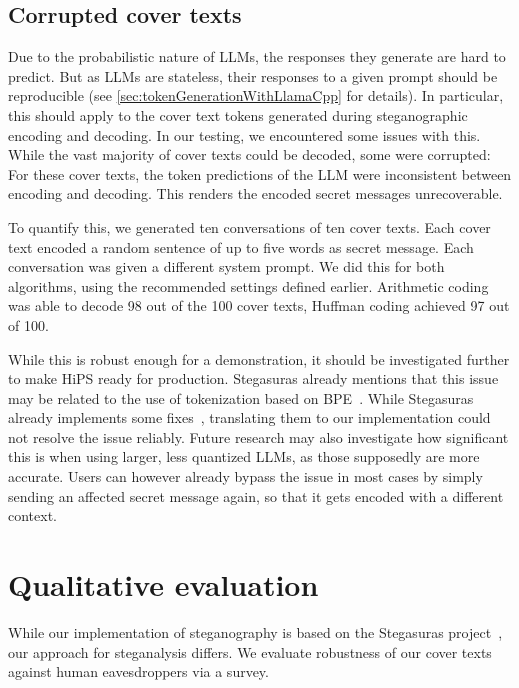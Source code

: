 \subsection{Corrupted cover texts}
\label{sec:corruptedCoverTexts}
Due to the probabilistic nature of \glspl{LLM}, the responses they generate are hard to predict. But as \glspl{LLM} are stateless, their responses to a given prompt should be reproducible (see \cref{sec:tokenGenerationWithLlamaCpp} for details). In particular, this should apply to the cover text tokens generated during steganographic encoding and decoding. In our testing, we encountered some issues with this. While the vast majority of cover texts could be decoded, some were corrupted: For these cover texts, the token predictions of the \gls{LLM} were inconsistent between encoding and decoding. This renders the encoded secret messages unrecoverable.

To quantify this, we generated ten conversations of ten cover texts. Each cover text encoded a random sentence of up to five words as secret message. Each conversation was given a different system prompt. We did this for both algorithms, using the recommended settings defined earlier. Arithmetic coding was able to decode 98 out of the 100 cover texts, Huffman coding achieved 97 out of 100.

While this is robust enough for a demonstration, it should be investigated further to make \gls{HiPS} ready for production. Stegasuras already mentions that this issue may be related to the use of tokenization based on \gls{BPE}~\cite{zieglerStegasuras2025}. While Stegasuras already implements some fixes~\cite{zieglerHarvardnlpNeuralSteganography2025}, translating them to our implementation could not resolve the issue reliably. Future research may also investigate how significant this is when using larger, less quantized \glspl{LLM}, as those supposedly are more accurate. Users can however already bypass the issue in most cases by simply sending an affected secret message again, so that it gets encoded with a different context.

\section{Qualitative evaluation}
\label{sec:qualitativeEvaluation}
While our implementation of steganography is based on the Stegasuras project~\cite{zieglerNeuralLinguisticSteganography2019}, our approach for steganalysis differs. We evaluate robustness of our cover texts against human eavesdroppers via a survey.

